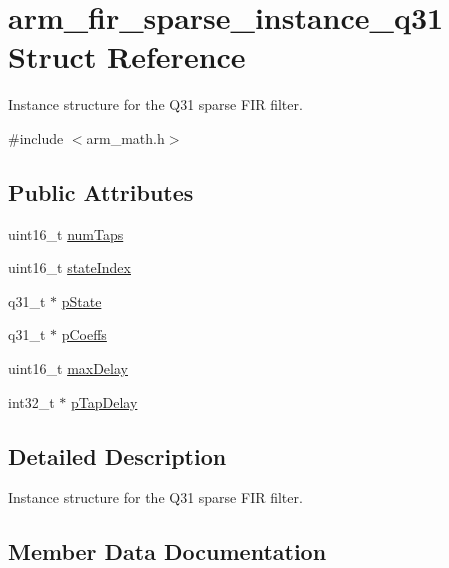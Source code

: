 \hypertarget{structarm__fir__sparse__instance__q31}{}\section{arm\+\_\+fir\+\_\+sparse\+\_\+instance\+\_\+q31 Struct Reference}
\label{structarm__fir__sparse__instance__q31}


Instance structure for the Q31 sparse F\+IR filter.  




{\ttfamily \#include $<$arm\+\_\+math.\+h$>$}

\subsection*{Public Attributes}
\begin{DoxyCompactItemize}
\item 
uint16\+\_\+t \hyperlink{structarm__fir__sparse__instance__q31_a07b6c01e58ec6dde384719130d36b0dc}{num\+Taps}
\item 
uint16\+\_\+t \hyperlink{structarm__fir__sparse__instance__q31_a557ed9d477e76e4ad2019344f19f568a}{state\+Index}
\item 
q31\+\_\+t $\ast$ \hyperlink{structarm__fir__sparse__instance__q31_a830be89daa5a393b225048889aa045d1}{p\+State}
\item 
q31\+\_\+t $\ast$ \hyperlink{structarm__fir__sparse__instance__q31_a093d6227f0d1597982cd083fb126f4e0}{p\+Coeffs}
\item 
uint16\+\_\+t \hyperlink{structarm__fir__sparse__instance__q31_afdd3a1dc72132c854dc379154b68b674}{max\+Delay}
\item 
int32\+\_\+t $\ast$ \hyperlink{structarm__fir__sparse__instance__q31_ab87ae457adec8f727afefaa2599fc983}{p\+Tap\+Delay}
\end{DoxyCompactItemize}


\subsection{Detailed Description}
Instance structure for the Q31 sparse F\+IR filter. 

\subsection{Member Data Documentation}
